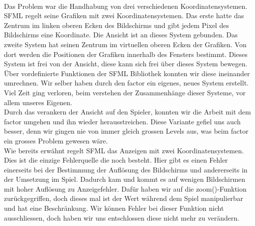 \documentclass[12pt,a4paper]{scrartcl}
\begin{document}
\\
Das Problem war die Handhabung von drei verschiedenen Koordinatensystemen.
SFML regelt seine Grafiken mit zwei Koordinatensystemen.
Das erste hatte das Zentrum im linken oberen Ecken des Bildschirms und gibt jedem Pixel des Bildschirms eine Koordinate. 
Die Ansicht ist an dieses System gebunden.
Das zweite System hat seinen Zentrum im virtuellen oberen Ecken der Grafiken. 
Von dort werden die Positionen der Grafiken innerhalb des Fensters bestimmt. 
Dieses System ist frei von der Ansicht, diese kann sich frei über dieses System bewegen.
Über vordefinierte Funktionen der SFML Bibliothek konnten wir diese ineinander umrechnen.
Wir selber haben durch den factor ein eigenes, neues System erstellt.
Viel Zeit ging verloren, beim verstehen der Zusammenhänge dieser Systeme, vor allem unseres Eigenen.
\\
Durch das verankern der Ansicht auf den Spieler, konnten wir die Arbeit mit dem factor umgehen und ihn wieder herausstreichen.
Diese Variante gefiel uns auch besser, denn wir gingen nie von immer gleich grossen Levels aus, was beim factor ein grosses Problem gewesen wäre.
\\
Wie bereits erwähnt regelt SFML das Anzeigen mit zwei Koordinatensystemen.
Dies ist die einzige Fehlerquelle die noch besteht.
Hier gibt es einen Fehler einerseits bei der Bestimmung der Auflösung des Bildschirms und andererseits in der Umsetzung im Spiel.
Dadurch kam und kommt es auf wenigen Bildschirmen mit hoher Auflösung zu Anzeigefehler.
Dafür haben wir auf die zoom()-Funktion zurückgegriffen, doch dieses mal ist der Wert während dem Spiel manipulierbar und hat eine Beschränkung.
Wir können Fehler bei dieser Funktion nicht ausschliessen, doch haben wir uns entschlossen diese nicht mehr zu verändern.
\end{document}
